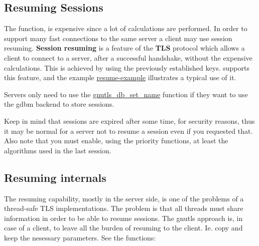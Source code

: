 \subsection{Resuming Sessions}
\par
The 
 function, is expensive since a lot of calculations are performed. In order to support many fast connections to
the same server a client may use session resuming. {\bf Session resuming} is a
feature of the {\bf TLS} protocol which allows a client to connect to a server,
after a successful handshake, without the expensive calculations. This is
achieved by using the previously
established keys. \gnutls{} supports this feature, and the
example \hyperref{resume client}{resume client (see Section }{)}{resume-example} illustrates a typical use of it.
\par
Servers only need to use the
\hyperref{gnutls\_db\_set\_name()}{gnutls\_db\_set\_name() (see Section }{)}{gnutls_db_set_name} function if they want to use the gdbm
backend to store sessions. 
\par
Keep in mind that sessions are expired after some time, for security reasons, thus
it may be normal for a server not to resume a session even if you requested that.
Also note that you must enable, using the priority functions, at least the
algorithms used in the last session.

\subsection{Resuming internals}
The resuming capability, mostly in the server side, is one of the problems of a thread-safe TLS
implementations. The problem is that all threads must share information in
order to be able to resume sessions. The gnutls approach is, in case of a
client, to leave all the burden of resuming to the client. Ie. copy and keep the
nesessary parameters. See the functions:

